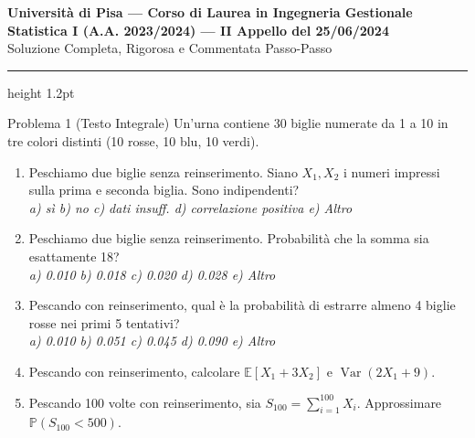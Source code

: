 \documentclass[11pt,a4paper]{article}
\newcommand{\EE}{\mathbb{E}}
\newcommand{\Prob}{\mathbb{P}}
\newcommand{\Var}{\operatorname{Var}}
\begin{document}
\begin{center}
    {\LARGE\bfseries\color{navyblue} Università di Pisa --- Corso di Laurea in Ingegneria Gestionale}\\[0.4em]
    {\Large\bfseries Statistica I (A.A. 2023/2024) --- II Appello del 25/06/2024}\\[0.3em]
    {\large\textsf{Soluzione Completa, Rigorosa e Commentata Passo-Passo}}
\end{center}
\vspace{0.5em}
\hrule height 1.2pt
\vspace{1.5em}

\begin{problemabox}{Problema 1 (Testo Integrale)}
Un'urna contiene 30 biglie numerate da 1 a 10 in tre colori distinti (10 rosse, 10 blu, 10 verdi).
\begin{enumerate}[label=(\alph*)]
    \item Peschiamo due biglie senza reinserimento. Siano $X_1, X_2$ i numeri impressi sulla prima e seconda biglia. Sono indipendenti?\\
    \emph{a) sì \quad b) no \quad c) dati insuff. \quad d) correlazione positiva \quad e) Altro}
    \item Peschiamo due biglie senza reinserimento. Probabilità che la somma sia esattamente 18?\\
    \emph{a) 0.010 \quad b) 0.018 \quad c) 0.020 \quad d) 0.028 \quad e) Altro}
    \item Pescando con reinserimento, qual è la probabilità di estrarre almeno 4 biglie rosse nei primi 5 tentativi?\\
    \emph{a) 0.010 \quad b) 0.051 \quad c) 0.045 \quad d) 0.090 \quad e) Altro}
    \item Pescando con reinserimento, calcolare $\EE[X_1 + 3X_2]$ e $\Var(2X_1 + 9)$.
    \item Pescando 100 volte con reinserimento, sia $S_{100} = \sum_{i=1}^{100} X_i$. Approssimare $\Prob(S_{100} < 500)$.
\end{enumerate}
\end{problemabox}
\end{document}
